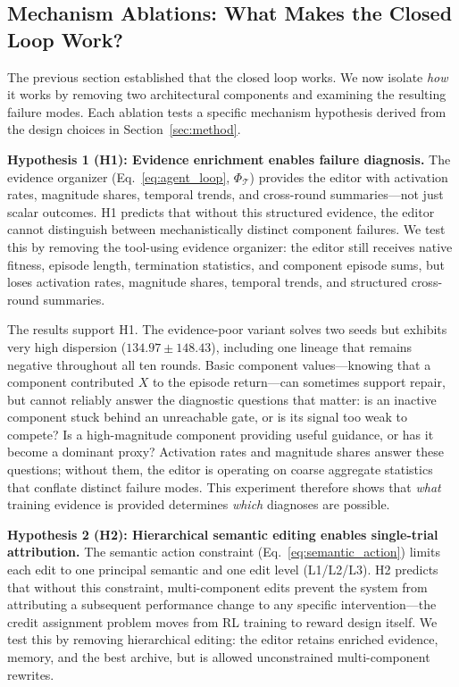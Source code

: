 \subsection{Mechanism Ablations: What Makes the Closed Loop Work?}
\label{sec:mechanism_ablations}

The previous section established that the closed loop works. We now isolate \emph{how} it works by removing two architectural components and examining the resulting failure modes. Each ablation tests a specific mechanism hypothesis derived from the design choices in Section~\ref{sec:method}.

\textbf{Hypothesis 1 (H1): Evidence enrichment enables failure diagnosis.} The evidence organizer (Eq.~\ref{eq:agent_loop}, $\Phi_{\mathcal T}$) provides the editor with activation rates, magnitude shares, temporal trends, and cross-round summaries---not just scalar outcomes. H1 predicts that without this structured evidence, the editor cannot distinguish between mechanistically distinct component failures. We test this by removing the tool-using evidence organizer: the editor still receives native fitness, episode length, termination statistics, and component episode sums, but loses activation rates, magnitude shares, temporal trends, and structured cross-round summaries.

The results support H1. The evidence-poor variant solves two seeds but exhibits very high dispersion ($134.97\pm148.43$), including one lineage that remains negative throughout all ten rounds. Basic component values---knowing that a component contributed $X$ to the episode return---can sometimes support repair, but cannot reliably answer the diagnostic questions that matter: is an inactive component stuck behind an unreachable gate, or is its signal too weak to compete? Is a high-magnitude component providing useful guidance, or has it become a dominant proxy? Activation rates and magnitude shares answer these questions; without them, the editor is operating on coarse aggregate statistics that conflate distinct failure modes. This experiment therefore shows that \emph{what} training evidence is provided determines \emph{which} diagnoses are possible.

\textbf{Hypothesis 2 (H2): Hierarchical semantic editing enables single-trial attribution.} The semantic action constraint (Eq.~\ref{eq:semantic_action}) limits each edit to one principal semantic and one edit level (L1/L2/L3). H2 predicts that without this constraint, multi-component edits prevent the system from attributing a subsequent performance change to any specific intervention---the credit assignment problem moves from RL training to reward design itself. We test this by removing hierarchical editing: the editor retains enriched evidence, memory, and the best archive, but is allowed unconstrained multi-component rewrites.

